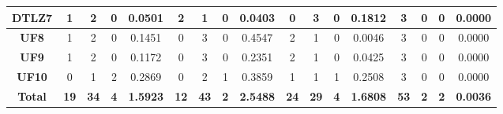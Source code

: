 \begin{table*}[t]
{\begin{tabular}{c|c|c|c|c|c|c|c|c|c|c|c|c|c|c|c|c|}
\multicolumn{1}{|c|}{\textbf{DTLZ7}} & 1                   & 2                     & 0                          & 0.0501          & 2                   & 1                     & 0                          & 0.0403          & 0                   & 3                     & 0                          & 0.1812          & 3                   & 0                     & 0                          & 0.0000          \\ \hline
\multicolumn{1}{|c|}{\textbf{UF8}}   & 1                   & 2                     & 0                          & 0.1451          & 0                   & 3                     & 0                          & 0.4547          & 2                   & 1                     & 0                          & 0.0046          & 3                   & 0                     & 0                          & 0.0000          \\ \hline
\multicolumn{1}{|c|}{\textbf{UF9}}   & 1                   & 2                     & 0                          & 0.1172          & 0                   & 3                     & 0                          & 0.2351          & 2                   & 1                     & 0                          & 0.0425          & 3                   & 0                     & 0                          & 0.0000          \\ \hline
\multicolumn{1}{|c|}{\textbf{UF10}}  & 0                   & 1                     & 2                          & 0.2869          & 0                   & 2                     & 1                          & 0.3859          & 1                   & 1                     & 1                          & 0.2508          & 3                   & 0                     & 0                          & 0.0000          \\ \hline
\multicolumn{1}{|c|}{\textbf{Total}} & \textbf{19}         & \textbf{34}           & \textbf{4}                 & \textbf{1.5923} & \textbf{12}         & \textbf{43}           & \textbf{2}                 & \textbf{2.5488} & \textbf{24}         & \textbf{29}           & \textbf{4}                 & \textbf{1.6808} & \textbf{53}         & \textbf{2}            & \textbf{2}                 & \textbf{0.0036} \\ \hline
\end{tabular}%
}
\end{table*}


